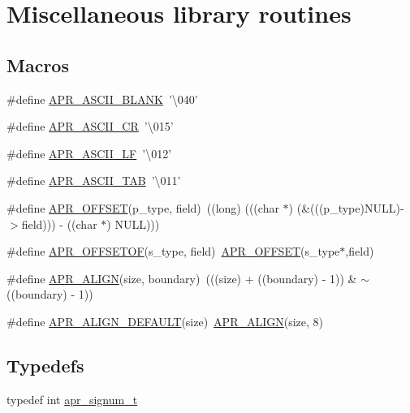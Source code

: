\hypertarget{group__apr__general}{\section{Miscellaneous library routines}
\label{group__apr__general}
}
\subsection*{Macros}
\begin{DoxyCompactItemize}
\item 
\#define \hyperlink{group__apr__general_ga60fc208d93123acc7cf915a66e49e654}{A\-P\-R\-\_\-\-A\-S\-C\-I\-I\-\_\-\-B\-L\-A\-N\-K}~'\textbackslash{}040'
\item 
\#define \hyperlink{group__apr__general_ga91c14ef7f03e82c07f4d3d56f63f8b6a}{A\-P\-R\-\_\-\-A\-S\-C\-I\-I\-\_\-\-C\-R}~'\textbackslash{}015'
\item 
\#define \hyperlink{group__apr__general_ga9e76601cef56a7a5b25f73fe6d57d7d9}{A\-P\-R\-\_\-\-A\-S\-C\-I\-I\-\_\-\-L\-F}~'\textbackslash{}012'
\item 
\#define \hyperlink{group__apr__general_gac7162c0b5d026a0717aaa98bf581349d}{A\-P\-R\-\_\-\-A\-S\-C\-I\-I\-\_\-\-T\-A\-B}~'\textbackslash{}011'
\item 
\#define \hyperlink{group__apr__general_ga41e537d6ad732766d12cd4eb61531678}{A\-P\-R\-\_\-\-O\-F\-F\-S\-E\-T}(p\-\_\-type, field)~((long) (((char $\ast$) (\&(((p\-\_\-type)N\-U\-L\-L)-\/$>$field))) -\/ ((char $\ast$) N\-U\-L\-L)))
\item 
\#define \hyperlink{group__apr__general_gac16b1187b6ea63706c5dd48c88323dec}{A\-P\-R\-\_\-\-O\-F\-F\-S\-E\-T\-O\-F}(s\-\_\-type, field)~\hyperlink{group__apr__general_ga41e537d6ad732766d12cd4eb61531678}{A\-P\-R\-\_\-\-O\-F\-F\-S\-E\-T}(s\-\_\-type$\ast$,field)
\item 
\#define \hyperlink{group__apr__general_ga3c4f50d14ebe7a6add282d879521d552}{A\-P\-R\-\_\-\-A\-L\-I\-G\-N}(size, boundary)~(((size) + ((boundary) -\/ 1)) \& $\sim$((boundary) -\/ 1))
\item 
\#define \hyperlink{group__apr__general_gab484e98426221f3212fcb67af0467381}{A\-P\-R\-\_\-\-A\-L\-I\-G\-N\-\_\-\-D\-E\-F\-A\-U\-L\-T}(size)~\hyperlink{group__apr__general_ga3c4f50d14ebe7a6add282d879521d552}{A\-P\-R\-\_\-\-A\-L\-I\-G\-N}(size, 8)
\end{DoxyCompactItemize}
\subsection*{Typedefs}
\begin{DoxyCompactItemize}
\item 
typedef int \hyperlink{group__apr__general_gafe9e657d61b61d62ecba34299a82a7ea}{apr\-\_\-signum\-\_\-t}
\end{DoxyCompactItemize}


